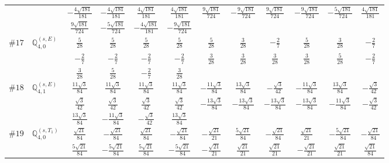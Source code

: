\documentclass[fleqn,9pt,landscape]{jsarticle}
\begin{document}
\begin{center}
\begin{longtable}{lcccccccccc}
& $ - \frac{4 \sqrt{181}}{181} $ & $ - \frac{4 \sqrt{181}}{181} $ & $ \frac{4 \sqrt{181}}{181} $ & $ \frac{4 \sqrt{181}}{181} $ & $ \frac{9 \sqrt{181}}{724} $ & $ - \frac{9 \sqrt{181}}{724} $ & $ \frac{9 \sqrt{181}}{724} $ & $ - \frac{9 \sqrt{181}}{724} $ & $ - \frac{5 \sqrt{181}}{724} $ & $ \frac{4 \sqrt{181}}{181} $ \\
& $ \frac{9 \sqrt{181}}{724} $ & $ - \frac{5 \sqrt{181}}{724} $ & $ - \frac{4 \sqrt{181}}{181} $ & $ - \frac{9 \sqrt{181}}{724} $ & $  $ & $  $ & $  $ & $  $ & $  $ & $  $ \\ \hline
$ \#17\quad \mathbb{Q}_{4,0}^{(s,E)} $ & $ \frac{5}{28} $ & $ \frac{5}{28} $ & $ \frac{5}{28} $ & $ \frac{5}{28} $ & $ \frac{5}{28} $ & $ \frac{3}{28} $ & $ - \frac{2}{7} $ & $ \frac{5}{28} $ & $ \frac{3}{28} $ & $ - \frac{2}{7} $ \\
& $ - \frac{2}{7} $ & $ - \frac{2}{7} $ & $ - \frac{2}{7} $ & $ - \frac{2}{7} $ & $ \frac{3}{28} $ & $ \frac{3}{28} $ & $ \frac{3}{28} $ & $ \frac{3}{28} $ & $ \frac{5}{28} $ & $ - \frac{2}{7} $ \\
& $ \frac{3}{28} $ & $ \frac{5}{28} $ & $ - \frac{2}{7} $ & $ \frac{3}{28} $ & $  $ & $  $ & $  $ & $  $ & $  $ & $  $ \\ \hline
$ \#18\quad \mathbb{Q}_{4,1}^{(s,E)} $ & $ \frac{11 \sqrt{3}}{84} $ & $ \frac{11 \sqrt{3}}{84} $ & $ \frac{11 \sqrt{3}}{84} $ & $ \frac{11 \sqrt{3}}{84} $ & $ - \frac{11 \sqrt{3}}{84} $ & $ \frac{13 \sqrt{3}}{84} $ & $ - \frac{\sqrt{3}}{42} $ & $ - \frac{11 \sqrt{3}}{84} $ & $ \frac{13 \sqrt{3}}{84} $ & $ - \frac{\sqrt{3}}{42} $ \\
& $ \frac{\sqrt{3}}{42} $ & $ \frac{\sqrt{3}}{42} $ & $ \frac{\sqrt{3}}{42} $ & $ \frac{\sqrt{3}}{42} $ & $ - \frac{13 \sqrt{3}}{84} $ & $ - \frac{13 \sqrt{3}}{84} $ & $ - \frac{13 \sqrt{3}}{84} $ & $ - \frac{13 \sqrt{3}}{84} $ & $ - \frac{11 \sqrt{3}}{84} $ & $ - \frac{\sqrt{3}}{42} $ \\
& $ \frac{13 \sqrt{3}}{84} $ & $ - \frac{11 \sqrt{3}}{84} $ & $ - \frac{\sqrt{3}}{42} $ & $ \frac{13 \sqrt{3}}{84} $ & $  $ & $  $ & $  $ & $  $ & $  $ & $  $ \\ \hline
$ \#19\quad \mathbb{Q}_{4,0}^{(s,T_{1})} $ & $ \frac{\sqrt{21}}{84} $ & $ - \frac{\sqrt{21}}{84} $ & $ \frac{\sqrt{21}}{84} $ & $ - \frac{\sqrt{21}}{84} $ & $ - \frac{\sqrt{21}}{21} $ & $ \frac{5 \sqrt{21}}{84} $ & $ - \frac{\sqrt{21}}{84} $ & $ \frac{\sqrt{21}}{21} $ & $ - \frac{5 \sqrt{21}}{84} $ & $ - \frac{\sqrt{21}}{84} $ \\
& $ \frac{5 \sqrt{21}}{84} $ & $ - \frac{5 \sqrt{21}}{84} $ & $ \frac{5 \sqrt{21}}{84} $ & $ - \frac{5 \sqrt{21}}{84} $ & $ - \frac{\sqrt{21}}{21} $ & $ \frac{\sqrt{21}}{21} $ & $ \frac{\sqrt{21}}{21} $ & $ - \frac{\sqrt{21}}{21} $ & $ \frac{\sqrt{21}}{21} $ & $ \frac{\sqrt{21}}{84} $ \\

\end{longtable}
\end{center}
\end{document}
